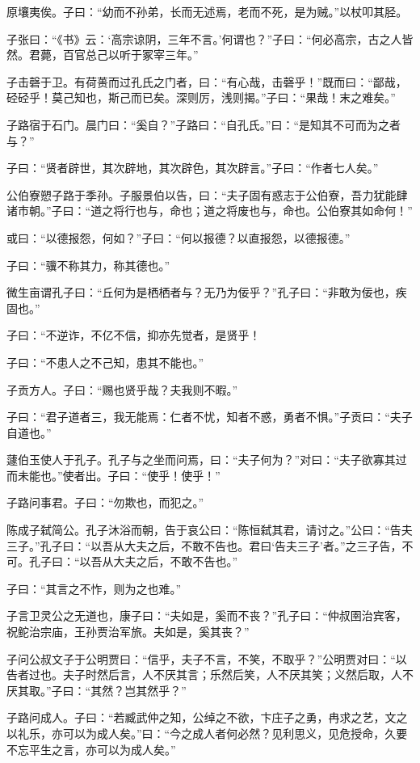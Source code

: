 \documentclass[a5paper]{ctexbook}
\begin{document}
    原壤夷俟。子曰：“幼而不孙弟，长而无述焉，老而不死，是为贼。”以杖叩其胫。

    子张曰：“《书》云：‘高宗谅阴，三年不言。’何谓也？”子曰：“何必高宗，古之人皆然。君薨，百官总己以听于冢宰三年。”

    子击磬于卫。有荷蒉而过孔氏之门者，曰：“有心哉，击磬乎！”既而曰：“鄙哉，硁硁乎！莫己知也，斯己而已矣。深则厉，浅则揭。”子曰：“果哉！末之难矣。”

    子路宿于石门。晨门曰：“奚自？”子路曰：“自孔氏。”曰：“是知其不可而为之者与？”

    子曰：“贤者辟世，其次辟地，其次辟色，其次辟言。”子曰：“作者七人矣。”

    公伯寮愬子路于季孙。子服景伯以告，曰：“夫子固有惑志于公伯寮，吾力犹能肆诸市朝。”子曰：“道之将行也与，命也；道之将废也与，命也。公伯寮其如命何！”

    或曰：“以德报怨，何如？”子曰：“何以报德？以直报怨，以德报德。”

    子曰：“骥不称其力，称其德也。”

    微生亩谓孔子曰：“丘何为是栖栖者与？无乃为佞乎？”孔子曰：“非敢为佞也，疾固也。”

    子曰：“不逆诈，不亿不信，抑亦先觉者，是贤乎！

    子曰：“不患人之不己知，患其不能也。”

    子贡方人。子曰：“赐也贤乎哉？夫我则不暇。”

    子曰：“君子道者三，我无能焉：仁者不忧，知者不惑，勇者不惧。”子贡曰：“夫子自道也。”

    蘧伯玉使人于孔子。孔子与之坐而问焉，曰：“夫子何为？”对曰：“夫子欲寡其过而未能也。”使者出。子曰：“使乎！使乎！”

    子路问事君。子曰：“勿欺也，而犯之。”

    陈成子弑简公。孔子沐浴而朝，告于哀公曰：“陈恒弑其君，请讨之。”公曰：“告夫三子。”孔子曰：“以吾从大夫之后，不敢不告也。君曰‘告夫三子’者。”之三子告，不可。孔子曰：“以吾从大夫之后，不敢不告也。”

    子曰：“其言之不怍，则为之也难。”

    子言卫灵公之无道也，康子曰：“夫如是，奚而不丧？”孔子曰：“仲叔圉治宾客，祝𬶍治宗庙，王孙贾治军旅。夫如是，奚其丧？”

    子问公叔文子于公明贾曰：“信乎，夫子不言，不笑，不取乎？”公明贾对曰：“以告者过也。夫子时然后言，人不厌其言；乐然后笑，人不厌其笑；义然后取，人不厌其取。”子曰：“其然？岂其然乎？”

    子路问成人。子曰：“若臧武仲之知，公绰之不欲，卞庄子之勇，冉求之艺，文之以礼乐，亦可以为成人矣。”曰：“今之成人者何必然？见利思义，见危授命，久要不忘平生之言，亦可以为成人矣。”
\end{document}
